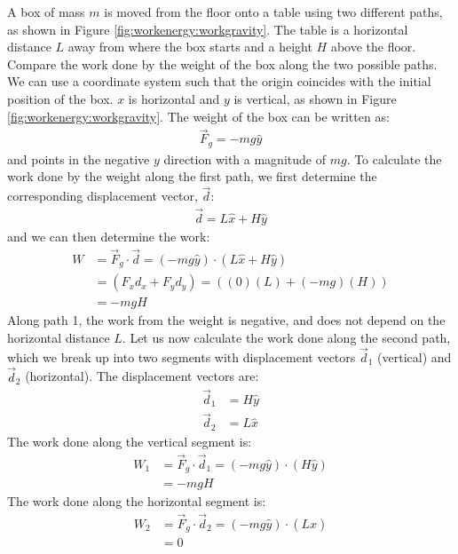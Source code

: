 \begin{example}{\label{ex:workenergy:workgravity}
A box of mass $m$ is moved from the floor onto a table using two different paths, as shown in Figure \ref{fig:workenergy:workgravity}. The table is a horizontal distance $L$ away from where the box starts and a height $H$ above the floor. Compare the work done by the weight of the box along the two possible paths.}
We can use a coordinate system such that the origin coincides with the initial position of the box. $x$ is horizontal and $y$ is vertical, as shown in Figure \ref{fig:workenergy:workgravity}. The weight of the box can be written as:
\begin{align*}
\vec F_g = -mg \hat y
\end{align*}
and points in the negative $y$ direction with a magnitude of $mg$. To calculate the work done by the weight along the first path, we first determine the corresponding displacement vector, $\vec d$:
\begin{align*}
\vec d = L\hat x + H\hat y
\end{align*}
and we can then determine the work:
\begin{align*}
W &= \vec F_g \cdot \vec d = (-mg \hat y) \cdot (L\hat x + H\hat y)\\
&=(F_xd_x+F_yd_y)=( (0)(L) + (-mg)(H))\\
&= -mgH
\end{align*}
Along path 1, the work from the weight is negative, and does not depend on the horizontal distance $L$. Let us now calculate the work done along the second path, which we break up into two segments with displacement vectors $\vec d_1$ (vertical) and $\vec d_2$ (horizontal). The displacement vectors are:
\begin{align*}
\vec d_1 &= H\hat y\\
\vec d_2 &= L\hat x
\end{align*}
The work done along the vertical segment is:
\begin{align*}
W_1 &= \vec F_g \cdot \vec d_1 = (-mg \hat y) \cdot (H\hat y)\\
&=-mgH
\end{align*}
The work done along the horizontal segment is:
\begin{align*}
W_2 &= \vec F_g \cdot \vec d_2 = (-mg \hat y) \cdot (L\hat x)\\
&=0
\end{align*}

\end{example}
